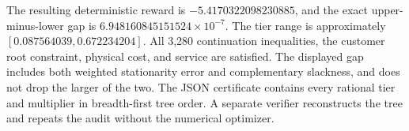 The resulting deterministic reward is $-5.4170322098230885$, and the exact upper-minus-lower gap is $6.948160845151524\times10^{-7}$. The tier range is approximately $[0.087564039,0.672234204]$. All 3,280 continuation inequalities, the customer root constraint, physical cost, and service are satisfied. The displayed gap includes both weighted stationarity error and complementary slackness, and does not drop the larger of the two. The JSON certificate contains every rational tier and multiplier in breadth-first tree order. A separate verifier reconstructs the tree and repeats the audit without the numerical optimizer.
